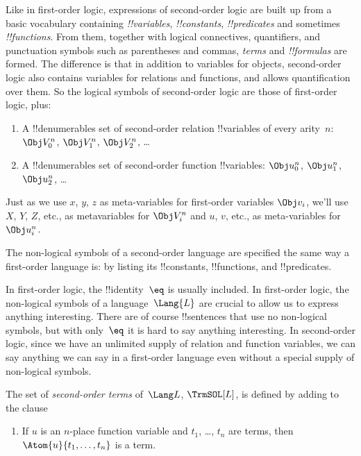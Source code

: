 \documentclass[../../../include/open-logic-section]{subfiles}
\begin{document}


Like in first-order logic, expressions of second-order logic are built
up from a basic vocabulary containing \emph{!!{variable}s},
\emph{!!{constant}s}, \emph{!!{predicate}s} and sometimes
\emph{!!{function}s}.  From them, together with logical connectives,
quantifiers, and punctuation symbols such as parentheses and commas,
\emph{terms} and \emph{!!{formula}s} are formed.  The difference is
that in addition to variables for objects, second-order logic also
contains variables for relations and functions, and allows
quantification over them. So the logical symbols of second-order logic
are those of first-order logic, plus:

\begin{enumerate}
\item A !!{denumerable}s set of second-order relation !!{variable}s of
  every arity~$n$: $\Obj V_0^n$, $\Obj V_1^n$, $\Obj V_2^n$, \dots
\item A !!{denumerable}s set of second-order function !!{variable}s:
  $\Obj u_0^n$, $\Obj u_1^n$, $\Obj u_2^n$, \dots
\end{enumerate}

Just as we use $x$, $y$, $z$ as meta-variables for first-order
variables $\Obj v_i$, we'll use $X$, $Y$, $Z$, etc., as metavariables
for $\Obj V_i^n$ and $u$, $v$, etc., as meta-variables for~$\Obj u_i^n$.

\begin{explain}
The non-logical symbols of a second-order language are specified the
same way a first-order language is: by listing its !!{constant}s,
!!{function}s, and !!{predicate}s.

In first-order logic, the !!{identity}~$\eq$ is usually included. In
first-order logic, the non-logical symbols of a language~$\Lang{L}$
are crucial to allow us to express anything interesting. There are of
course !!{sentence}s that use no non-logical symbols, but with
only~$\eq$ it is hard to say anything interesting.  In second-order
logic, since we have an unlimited supply of relation and function
variables, we can say anything we can say in a first-order language
even without a special supply of non-logical symbols.
\end{explain}

\begin{defn}
The set of \emph{second-order terms} of~$\Lang L$, $\TrmSOL[L]$, is
defined by adding to  the clause
\begin{enumerate}
\item If $u$ is an $n$-place function variable and $t_1$, \dots, $t_n$
  are terms, then $\Atom{u}{t_1, \ldots, t_n}$ is a term.
\end{enumerate}
\end{defn}
\end{document}
